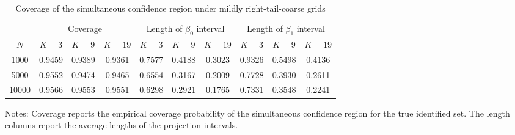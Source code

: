 \begin{table}
\centering
\begin{threeparttable}[!h]
\centering
\caption{\label{tab:partial_identification_region_coverage_right_tail_coarse_mild} Coverage of the simultaneous confidence region under mildly right-tail-coarse grids}
\centering
\begin{tabular}[t]{cccccccccc}
\toprule
\multicolumn{1}{c}{ } & \multicolumn{3}{c}{Coverage} & \multicolumn{3}{c}{Length of $\beta_0$ interval} & \multicolumn{3}{c}{Length of $\beta_1$ interval} \\
\cmidrule(l{3pt}r{3pt}){2-4} \cmidrule(l{3pt}r{3pt}){5-7} \cmidrule(l{3pt}r{3pt}){8-10}
$N$ & $K = 3$ & $K = 9$ & $K = 19$ & $K = 3$ & $K = 9$ & $K = 19$ & $K = 3$ & $K = 9$ & $K = 19$\\
\midrule
1000 & 0.9459 & 0.9389 & 0.9361 & 0.7577 & 0.4188 & 0.3023 & 0.9326 & 0.5498 & 0.4136\\
5000 & 0.9552 & 0.9474 & 0.9465 & 0.6554 & 0.3167 & 0.2009 & 0.7728 & 0.3930 & 0.2611\\
10000 & 0.9566 & 0.9553 & 0.9551 & 0.6298 & 0.2921 & 0.1765 & 0.7331 & 0.3548 & 0.2241\\
\bottomrule
\end{tabular}
\begin{tablenotes}
\footnotesize
\item \parbox{\linewidth}{Notes: Coverage reports the empirical coverage probability of the simultaneous confidence region for the true identified set. The length columns report the average lengths of the projection intervals.}
\end{tablenotes}
\end{threeparttable}
\end{table}